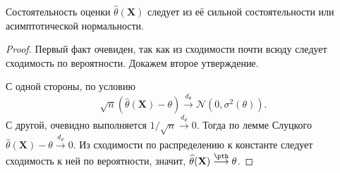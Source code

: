 \begin{proposition}\label{relation_between_conv}
    Состоятельность оценки $\widehat{\theta}(\mathbf X)$ следует из её сильной состоятельности или асимптотической нормальности.
\end{proposition}

\begin{proof}
    Первый факт очевиден, так как из сходимости почти всюду следует сходимость по вероятности. Докажем второе утверждение.

    С одной стороны, по условию $$\sqrt{n}\left(\widehat{\theta}(\mathbf X)-\theta\right) \stackrel{d_{\theta}}{\longrightarrow} \mathcal{N}(0, \sigma^2(\theta)).$$
    С другой, очевидно выполняется $1 / \sqrt{n} \stackrel{d_{\theta}}{\longrightarrow} 0$. Тогда по лемме Слуцкого $\widehat{\theta}(\mathbf X) - \theta \stackrel{d_{\theta}}{\longrightarrow} 0$. Из сходимости по распределению к константе следует сходимость к ней по вероятности, значит, $\widehat{\theta}(\mathbf X)
    \stackrel{\pth}{\longrightarrow} \theta$.
\end{proof}

